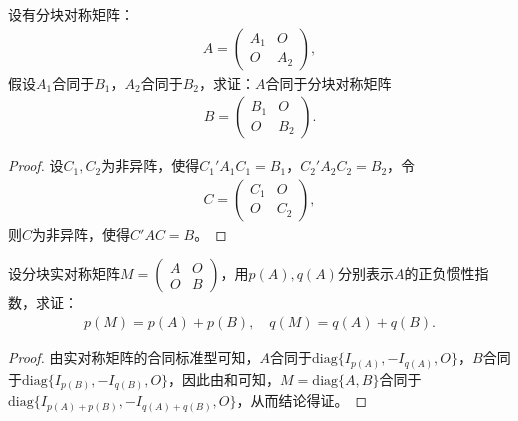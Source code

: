 \documentclass[../../main.tex]{subfiles}%
\begin{document}
\begin{proposition}\label{proposition:分块准对角阵合同于每个块的合同阵}
设有分块对称矩阵：
\begin{align*}
A = \begin{pmatrix}
A_1 & O \\
O & A_2
\end{pmatrix},
\end{align*}
假设\(A_1\)合同于\(B_1\)，\(A_2\)合同于\(B_2\)，求证：\(A\)合同于分块对称矩阵
\begin{align*}
B = \begin{pmatrix}
B_1 & O \\
O & B_2
\end{pmatrix}.
\end{align*}
\end{proposition} 
\begin{proof}
设\(C_1,C_2\)为非异阵，使得\(C_1'A_1C_1 = B_1\)，\(C_2'A_2C_2 = B_2\)，令
\begin{align*}
C = \begin{pmatrix}
C_1 & O \\
O & C_2
\end{pmatrix},
\end{align*}
则\(C\)为非异阵，使得\(C'AC = B\)。
\end{proof}

\begin{proposition}\label{proposition:分块准对角阵的正负惯性指数}
设分块实对称矩阵\(M = \begin{pmatrix}
A & O \\
O & B
\end{pmatrix}\)，用\(p(A),q(A)\)分别表示\(A\)的正负惯性指数，求证：
\begin{align*}
p(M)=p(A)+p(B),\quad q(M)=q(A)+q(B).
\end{align*}
\end{proposition} 
\begin{proof}
由实对称矩阵的合同标准型可知，\(A\)合同于\(\mathrm{diag}\{I_{p(A)}, -I_{q(A)},O\}\)，\(B\)合同于\(\mathrm{diag}\{I_{p(B)}, -I_{q(B)},O\}\)，因此由和可知，\(M = \mathrm{diag}\{A,B\}\)合同于\(\mathrm{diag}\{I_{p(A)+p(B)}, -I_{q(A)+q(B)},O\}\)，从而结论得证。
\end{proof}
\end{document}
